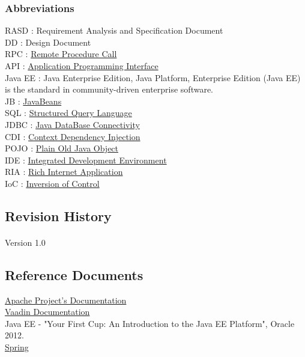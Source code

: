 \documentclass{article}
\begin{document}
			\subsubsection{Abbreviations}
			RASD : Requirement Analysis and Specification Document\\DD : Design Document\\RPC : \href{https://en.wikipedia.org/wiki/Remote_procedure_call}{Remote Procedure Call}\\API : \href{https://en.wikipedia.org/wiki/Application_programming_interface}{Application Programming Interface}\\Java EE : Java Enterprise Edition, Java Platform, Enterprise Edition (Java EE) is the standard in community-driven enterprise software.\\JB : \href{https://en.wikipedia.org/wiki/JavaBeans}{JavaBeans}\\SQL : \href{https://en.wikipedia.org/wiki/SQL}{Structured Query Language}\\JDBC : \href{https://en.wikipedia.org/wiki/Java_Database_Connectivity}{Java DataBase Connectivity}\\CDI : \href{http://www.vogella.com/tutorials/SpringDependencyInjection/article.html}{Context Dependency Injection}\\POJO : \href{https://en.wikipedia.org/wiki/Plain_old_Java_object}{Plain Old Java Object}\\IDE : \href{https://en.wikipedia.org/wiki/Integrated_development_environment}{Integrated Development Environment}\\RIA : \href{https://en.wikipedia.org/wiki/Rich_Internet_application}{Rich Internet Application}\\IoC : \href{https://en.wikipedia.org/wiki/Inversion_of_control}{Inversion of Control}
		\subsection{Revision History}
		\paragraph{} Version 1.0
		\subsection{Reference Documents}
\href{https://projects.apache.org/}{Apache Project's Documentation}\\
\href{http://vaadin.com/docs}{Vaadin Documentation}\\
Java EE - "Your First Cup: An Introduction to the Java EE Platform", Oracle 2012. \\
\href{http://spring.io/guides}{Spring}
\end{document}
